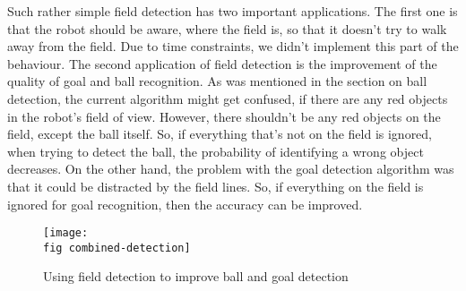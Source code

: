 Such rather simple field detection has two important applications. The first
one is that the robot should be aware, where the field is, so that it doesn't
try to walk away from the field. Due to time constraints, we didn't implement
this part of the behaviour. The second application of field detection is the
improvement of the quality of goal and ball recognition. As was mentioned in
the section on ball detection, the current algorithm might get confused, if
there are any red objects in the robot's field of view. However, there
shouldn't be any red objects on the field, except the ball itself. So, if
everything that's not on the field is ignored, when trying to detect the ball,
the probability of identifying a wrong object decreases. On the other hand, the
problem with the goal detection algorithm was that it could be distracted by
the field lines. So, if everything on the field is ignored for goal
recognition, then the accuracy can be improved.

\begin{figure}[ht]
  \texttt{[image: \\fig combined-detection]}
  \caption{Using field detection to improve ball and goal detection}
  \label{p figure combined-detection}
\end{figure}
